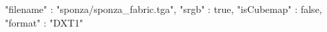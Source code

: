 { 
	"filename" : "sponza/sponza_fabric.tga", 
	"srgb" : true,
	"isCubemap" : false,
	"format" : "DXT1"
}